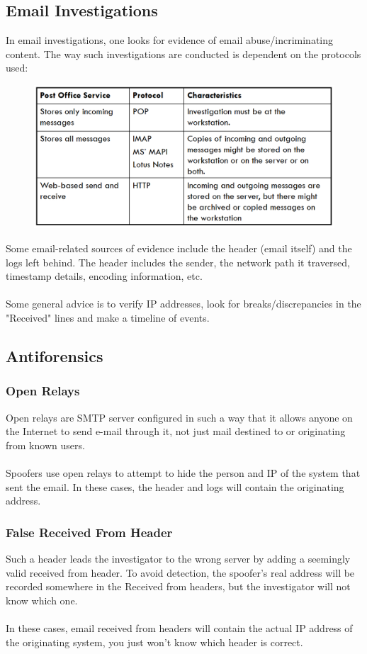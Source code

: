 \documentclass[10pt,a4paper]{report}
\begin{document}
\subsection{Email Investigations}
In email investigations, one looks for evidence of email abuse/incriminating content. The way such investigations are conducted is dependent on the protocols used:
\begin{figure}[H]
\centering
\includegraphics[scale=0.4]{21.png}
\end{figure}
Some email-related sources of evidence include the header (email itself) and the logs left behind. The header includes the sender, the network path it traversed, timestamp details, encoding information, etc.\\
\\
Some general advice is to verify IP addresses, look for breaks/discrepancies in the "Received" lines and make a timeline of events.
\subsection{Antiforensics}
\subsubsection{Open Relays}
Open relays are SMTP server configured in such a way that it allows anyone on the Internet to send e-mail through it, not just mail destined to or originating from known users.\\
\\
Spoofers use open relays to attempt to hide the person and IP of the system that sent the email. In these cases, the header and logs will contain the originating address.
\subsubsection{False Received From Header}
Such a header leads the investigator to the wrong server by adding a seemingly valid received from header. To avoid detection, the spoofer’s real address will be recorded somewhere in the Received from headers, but the investigator will not know which one.\\
\\
In these cases, email received from headers will contain the actual IP address of the originating system, you just won’t know which header is correct.
\end{document}
